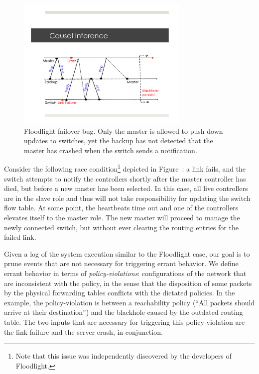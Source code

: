 \begin{figure}[t]
    \includegraphics[width=3.25in]{../diagrams/case_study/example_bug.pdf}
    \caption[]{\label{fig:example} Floodlight failover bug. Only the master is
               allowed to push down updates to switches, yet the backup has
               not detected that the master has crashed when the switch sends
               a notification.}
\end{figure}

Consider the following race condition\footnote{Note that this issue was
independently discovered by the developers of Floodlight.} depicted in Figure~\cite{fig:example}:
a link fails, and the switch attempts to notify the controllers shortly after the master
controller has died, but before a new master has been selected. In this case, all live controllers are in
the slave role and thus will not take responsibility for updating the switch
flow table. At some point, the heartbeats time out and one of the controllers
elevates itself to the master role. The new master will proceed to manage
the newly connected switch, but without ever clearing the routing entries for the failed link.

Given a log of the system execution similar to the Floodlight case,
our goal is to prune events that are not
necessary for triggering errant behavior. We define errant behavior in terms of {\em policy-violations}:
configurations of the network that are inconsistent
with the policy, in the sense that the disposition of some packets by the
physical forwarding tables conflicts with the dictated policies.
In the example, the policy-violation is between a reachability policy (``All
packets should arrive at their destination'') and the blackhole caused by the outdated
routing table. The two inputs that are necessary for
triggering this policy-violation are the link failure and the server crash, in
conjunction.

